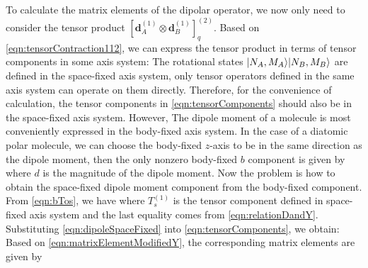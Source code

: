 To calculate the matrix elements of the dipolar operator, we now only need to consider the tensor product 
$\left[ \mathbf{d}_{A}^{(1)} \otimes \mathbf{d}_{B}^{(1)} \right]^{(2)}_{q}$. Based on \autoref{eqn:tensorContraction112}, we can express the tensor product in terms of tensor components in some axis system:
The rotational states $| N_A, M_A \rangle| N_B, M_B \rangle$ are defined in the space-fixed axis system, only tensor operators 
defined in the same axis system can operate on them directly. Therefore, for the convenience of calculation, the tensor 
components in \autoref{eqn:tensorComponents} should also be in the space-fixed axis system. 
However, The dipole moment of a molecule is
 most conveniently expressed in the body-fixed axis system. In the case of a diatomic polar molecule, we can choose
 the body-fixed $z$-axis to be in the same direction as the dipole moment, then the only nonzero body-fixed $b$ 
 component is given by
 where $d$ is the magnitude of the dipole moment. Now the problem is how to obtain the space-fixed dipole moment
  component from the body-fixed component. From \autoref{eqn:bTos}, we have
where $T^{(1)}_{s }$ is the tensor component defined in space-fixed axis system and the last equality comes from \autoref{eqn:relationDandY}. Substituting \autoref{eqn:dipoleSpaceFixed} into \autoref{eqn:tensorComponents}, we
obtain:
Based on \autoref{eqn:matrixElementModifiedY}, the corresponding matrix elements are given by


